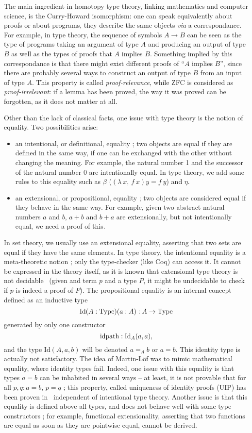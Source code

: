 The main ingredient in homotopy type theory, linking mathematics and
computer science, is the Curry-Howard isomorphism: one can speak
equivalently about proofs or about programs, they describe the same
objects {\em via} a correspondance. For example, in type theory, the
sequence of symbols $A\to B$ can be seen as the type of programs
taking an argument of type $A$ and producing an output of type $B$ as
well as the types of proofs that $A$ implies $B$. Something implied by
this correspondance is that there might exist different proofs of
``$A$ implies $B$'', since there are probably several ways to
construct an output of type $B$ from an input of type $A$. This
property is called {\em proof-relevance}, while ZFC is considered as
{\em proof-irrelevant}: if a lemma has been proved, the way it was
proved can be forgotten, as it does not matter at all.

Other than the lack of classical facts, one issue with type theory is
the notion of equality. Two possibilities arise:
\begin{itemize}
\item an intentional, or definitional, equality ; two objects are
equal if they are defined in the same way, \ie{} if one can be
exchanged with the other without changing the meaning. For example,
the natural number 1 and the successor of the natural number 0 are
intentionally equal. In type theory, we add some rules to this
equality such as $\beta$ ($(\lambda\ x,\,f\ x)y = f\ y$) and $\eta$.
\item an extensional, or propositional, equality ; two objects are
considered equal if they behave in the same way. For example, given
two abstract natural numbers $a$ and $b$, $a+b$ and $b+a$ are
extensionally, but not intentionally equal, \ie{} we need a proof of
this.
\end{itemize} In set theory, we usually use an extensional equality,
asserting that two sets are equal if they have the same elements. In
type theory, the intentional equality is a meta-theoretic notion ;
only the type-checker (like Coq) can access it. It cannot be expressed
in the theory itself, as it is known that extensional type theory is
not decidable~\cite{hofmann1995extensional} (given and term $p$ and a
type $P$, it might be undecidable to check if $p$ is indeed a proof of
$P$). The propositional equality is an internal concept defined as an
inductive type
\[ \mathrm{Id} (A:\operatorname{Type}) (a:A) : A \to \operatorname{Type}
\] generated by only one constructor
\[ \mathrm{idpath} : \mathrm{Id}_A(a,a),
\] and the type $\mathrm{Id}(A,a,b)$ will be denoted $a=_Ab$ or $a=b$.
This identity type is actually not satisfactory. The idea of
Martin-Löf was to mimic mathematical equality, where identity types
fail. Indeed, one issue with this equality is that types $a=b$ can be
inhabited in several ways -- at least, it is not provable that for all
$p,q:a=b$, $p=q$ ; this property, called uniqueness of identity proofs
(UIP) has been proven in~\cite{Hofmann96thegroupoid} independent of
intentional type theory.  Another issue is that this equality is
defined above all types, and does not behave well with some type
constructors ; for example, functional extensionality, asserting that
two functions are equal as soon as they are pointwise equal, cannot be
derived.

